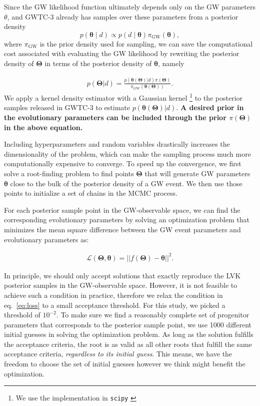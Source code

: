 \documentclass[linenumbers,twocolumn]{aastex631}
\begin{document}
Since the GW likelihood function ultimately depends only on the GW parameters
$\theta$, and GWTC-3 already has samples over these parameters from a posterior
density
\begin{equation}
    p\left( \bm{\theta} \mid d \right) \propto p\left( d \mid \bm{\theta} \right) \pi_\mathrm{GW} \left( \bm{\theta} \right),
\end{equation}
where $\pi_\mathrm{GW}$ is the prior density used for sampling, we can save the
computational cost associated with evaluating the GW likelihood by rewriting the
posterior density of $\bm{\Theta}$ in terms of the posterior density of
$\bm{\theta}$, namely

\begin{align}
    p(\bm{\Theta} | d) = \frac{p(\bm{\theta}(\bm{\Theta})| d) \pi(\bm{\Theta})}{\pi_\mathrm{GW}(\bm{\theta}(\bm{\Theta}))}.
\end{align}
We apply a kernel density estimator with a Gaussian kernel \footnote{We use the
implementation in \texttt{scipy} \cite{2020SciPy-NMeth}} to the posterior
samples released in GWTC-3 to estimate $p(\bm{\theta}(\bm{\Theta})|d)$.
\textbf{A desired prior in the evolutionary parameters can be included through
the prior $\pi(\bm{\Theta})$ in the above equation.}

Including hyperparameters and random variables %
drastically increases the dimensionality of the problem, which can make the
sampling process much more computationally expensive to converge. To speed up
the convergence, we first solve a root-finding problem to find points
$\bm{\Theta}$ that will generate GW parameters $\bm{\theta}$ close to the bulk
of the posterior density of a GW event.  We then use those points to initialize
a set of chains in the MCMC process.

For each posterior sample point in the GW-observable space, we can find the
corresponding evolutionary parameters by solving an optimization problem that
minimizes the mean square difference between the GW event parameters and
evolutionary parameters as:

\begin{align}
\mathcal{L}(\bm{\Theta},\bm{\theta}) = ||f(\bm{\Theta})-\bm{\theta}||^2.
\label{eq:loss}
\end{align}

In principle, we should only accept solutions that exactly reproduce the LVK
posterior samples in the GW-observable space. However, it is not feasible to
achieve such a condition in practice, therefore we relax the condition in
eq.~\ref{eq:loss} to a small acceptance threshold. For this study, we picked a
threshold of $10^{-2}$. To make sure we find a reasonably complete set of
progenitor parameters that corresponds to the posterior sample point, we use
1000 different initial guesses in solving the optimization problem. As long as
the solution fulfills the acceptance criteria, the root is as valid as all other
roots that fulfill the same acceptance criteria, \emph{regardless to its initial
guess}. This means, we have the freedom to choose the set of initial guesses
however we think might benefit the optimization.
\end{document}
